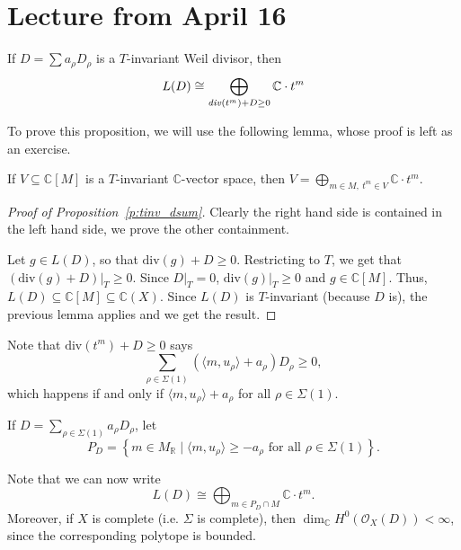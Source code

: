 \documentclass[a4paper,12pt]{amsart}
\newcommand{\RR}{\mathbb{R}}
\newcommand{\CC}{\mathbb{C}}
\begin{document}
\section{Lecture from April 16}

\begin{proposition}\label{p:tinv_dsum}
If $D = \sum a_\rho D_\rho$ is a $T$-invariant Weil divisor, then
$$
L(D) \cong \bigoplus_{\text{\emph{div}}(t^m) + D \geq 0} \CC \cdot t^m
$$
\end{proposition}

To prove this proposition, we will use the following lemma, whose proof is left as an exercise.

\begin{Lemma}
If $V \subseteq \CC[M]$ is a $T$-invariant $\CC$-vector space, then $V = \displaystyle \bigoplus_{m \in M,\ t^m \in V} \CC \cdot t^m$.
\end{Lemma}

\begin{proof}[Proof of Proposition~\ref{p:tinv_dsum}]
Clearly the right hand side is contained in the left hand side, we prove the other containment.

Let $g \in L(D)$, so that $\text{div}(g) + D \geq 0$. Restricting to $T$, we get that $\left. (\text{div}(g) + D ) \right|_T \geq 0$. Since $\left. D \right|_T = 0$, $\left. \text{div}(g) \right|_T  \geq 0$ and $g \in \CC[M]$. Thus, $L(D) \subseteq \CC[M] \subseteq \CC(X)$. Since $L(D)$ is $T$-invariant (because $D$ is), the previous lemma applies and we get the result.
\end{proof}

Note that $\text{div}(t^m) + D \geq 0$ says
$$
\sum_{\rho \in \Sigma(1)} \left( \langle m , u_\rho \rangle + a_\rho \right) D_\rho \geq 0,
$$
which happens if and only if $\langle m , u_\rho \rangle + a_\rho$ for all $\rho \in \Sigma(1)$.

\begin{definition}[Polyhedron of $D$]
If $D = \sum_{\rho \in \Sigma(1)} a_\rho D_\rho$, let
$$
P_D = \left\{ m \in M_\RR \mid \langle m , u_\rho \rangle \geq - a_\rho \text{ for all } \rho \in \Sigma(1) \right\}.
$$
\end{definition}

\begin{remark}
Note that we can now write
\begin{equation}\label{eq:lin_div_poly}
L(D) \cong \bigoplus_{m \in P_D \cap M} \CC \cdot t^m.
\end{equation}
Moreover, if $X$ is complete (i.e. $\Sigma$ is complete), then $\dim_\CC H^0(\mathcal{O}_X(D)) < \infty$, since the corresponding polytope is bounded.
\end{remark}
\end{document}
